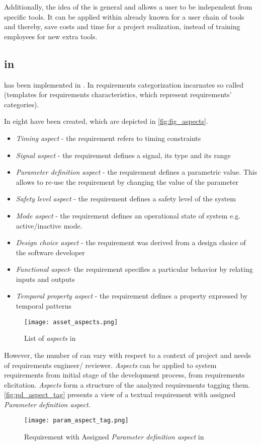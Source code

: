 Additionally, the idea of the \cc is general and allows a user to be independent from specific tools. It can be applied within already known for a user chain of tools and thereby, save costs and time for a project realization, instead of training employees for new extra tools. 

\subsection{\cbc in \autof}
\label{sec:cbcinaf}

\cc has been implemented in \autof. In \af requirements categorization incarnates so called \asp (templates for requirements characteristics, which represent requirements' categories).   

In \af eight \asp have been created, which are depicted in \autoref{fig:fig_aspects}. 

\begin{itemize}
\item	\textit{Timing aspect} - the requirement refers to timing constraints
\item	\textit{Signal aspect} - the requirement defines a signal, its type and its range
\item	\textit{Parameter definition aspect} - the requirement defines a parametric value. This allows to re-use the requirement by changing the value of the parameter
\item\textit{Safety level aspect} - the requirement defines a safety level of the system
\item	\textit{Mode aspect} - the requirement defines an operational state of system e.g. active/inactive mode.
\item	\textit{Design choice aspect} - the requirement was derived from a design choice of the software developer
\item	\textit{Functional aspect}- the requirement specifies a particular behavior by relating inputs and outputs
\item	\textit{Temporal property aspect} - the requirement defines a property expressed by temporal patterns
\end{itemize}

\begin{figure}[!t]
\centering
\texttt{[image: asset\_aspects.png]}
\caption{List of \textit{aspects} in \autof}
\label{fig:fig_aspects}
\end{figure}

However, the number of \asp can vary with respect to a context of project and needs of requirements engineer/ reviewer. \textit{Aspects} can be applied to system requirements from initial stage of the development process, from requirements elicitation. \textit{Aspects} form a structure of the analyzed requirements tagging them. \autoref{fig:pd_aspect_tag} presents a view of a textual requirement with assigned \textit{Parameter definition aspect}.
\begin{figure}[!t]
\centering
\texttt{[image: param\_aspect\_tag.png]}
\caption{Requirement with Assigned \textit{Parameter definition aspect} in \autof}
\label{fig:pd_aspect_tag}
\end{figure}

